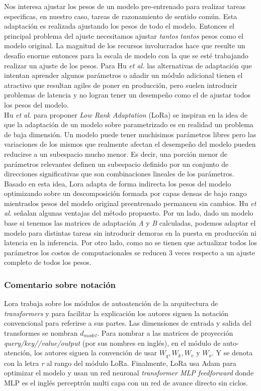 \documentclass[11pt,a4paper,twoside]{tesis}
\begin{document}
Nos interesa ajustar los pesos de un modelo pre-entrenado para realizar tareas especificas, en nuestro caso, tareas de razonamiento de sentido común. Esta adaptación es realizada ajustando los pesos de todo el modelo. Entonces el principal problema del ajuste necesitamos ajustar \textit{tantos} \textit{tantos} pesos como el modelo original. La magnitud de los recursos involucrados hace que resulte un desafío enorme entonces para la escala de modelo con la que se esté trabajando realizar un ajuste de los pesos.
Para Hu \textit{et al.} las alternativas de adaptación que intentan aprender algunos parámetros o añadir un módulo adicional tienen el atractivo que resultan agiles de poner en producción, pero suelen introducir problemas de latencia y no logran tener un desempeño como el de ajustar todos los pesos del modelo. \\

Hu \textit{et al.} para proponer  \textit{Low Rank Adaptation} (LoRa) se inspiran en la idea de que la adaptación de un modelo sobre parametrizado es en realidad un problema de baja dimensión. Un modelo puede tener muchisimos parámetros libres pero las variaciones de los mismos que realmente afectan el desempeño del modelo pueden reducirse a un subespacio mucho menor. Es decir, una porción menor de parámetros relevantes definen un subespacio definido por un conjunto de direcciones significativas que son combinaciones lineales de los parámetros. Basado en esta idea, Lora adapta de forma indirecta los pesos del modelo optimizando sobre un descomposición formada por capas densas de bajo rango mientraslos pesos del modelo original preentrenado permancen sin cambios.
Hu \textit{et al.} señalan algunas ventajas del método propuesto. Por un lado, dado un modelo base si tenemos las matrices de adaptación \textit{A} y \textit{B} calculadas, podemos adaptar el modelo para distintas tareas sin introducir demoras en la puesta en producción ni latencia en la inferencia. Por otro lado, como no se tienen que actualizar todos los parámetros los costos de computacionales se reducen 3 veces respecto a un ajuste completo de todos los pesos. \\

\subsubsection{Comentario sobre notación}
Lora trabaja sobre los módulos de autoatención de la arquitectura de \textit{transformers} y para facilitar la explicación los autores siguen la notación convencional para referirse a sus partes. Las dimensiones de entrada y salida del transformes se nombran $d_{model}$. Para nombrar a las matrices de proyección \textit{query/key//value/output} (por sus nombres en inglés),  en el módulo de auto-atención, los autores siguen la convención de usar $W_q, W_k, W_v$ y $W_o$. Y se denota con la letra \textit{r} al rango del módulo LoRa. Finalmente, LoRa usa Adam para optimizar el modelo y usan un red neuronal \textit{transformer MLP feedforward} donde MLP es el inglés perceptrón multi capa con un red de avance directo sin ciclos. 
\end{document}
